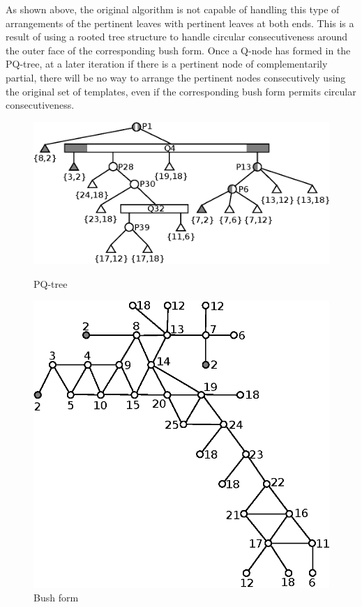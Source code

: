 \documentclass[a4]{jgaa-art}
\begin{document}
As shown above, the original algorithm is not capable of handling this type 
of arrangements of the pertinent leaves with pertinent leaves at both ends.
This is a result of using a rooted tree structure to handle circular 
consecutiveness around the outer face of the corresponding bush form. 
Once a Q-node has formed in the PQ-tree, at a later iteration 
if there is a pertinent node of complementarily partial, 
there will be no way to arrange the pertinent nodes consecutively using the 
original set of templates, 
even if the corresponding bush form permits circular consecutiveness.


\begin{figure}[!htb]
  \centering
  \begin{minipage}[b]{0.64\textwidth}
    \includegraphics[width=\textwidth]{pq_tree_sample_01}
    \caption{PQ-tree}
    \label{fig:pq_tree_01}
  \end{minipage}
  \hfill
  \begin{minipage}[b]{0.35\textwidth}
    \includegraphics[width=\textwidth]{bush_form_01}
    \caption{Bush form}
    \label{fig:bush_form_01}
  \end{minipage}
\end{figure}
\end{document}
